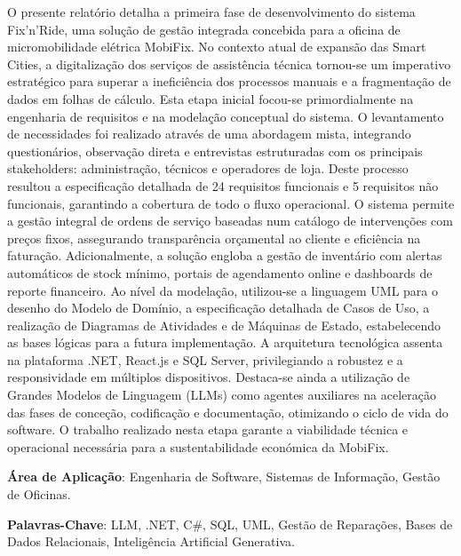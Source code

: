 \documentclass[a4paper,12pt]{scrreprt}
\begin{document}

\makecover


\renewenvironment{abstract}
 {\par\noindent\textbf{\Large\abstractname}\par\bigskip}
 {}

\begin{flushleft}
\begin{abstract}
   O presente relatório detalha a primeira fase de desenvolvimento do sistema Fix'n'Ride, uma solução de gestão integrada concebida para a oficina de micromobilidade elétrica MobiFix. No contexto atual de expansão das Smart Cities, a digitalização dos serviços de assistência técnica tornou-se um imperativo estratégico para superar a ineficiência dos processos manuais e a fragmentação de dados em folhas de cálculo. Esta etapa inicial focou-se primordialmente na engenharia de requisitos e na modelação conceptual do sistema. O levantamento de necessidades foi realizado através de uma abordagem mista, integrando questionários, observação direta e entrevistas estruturadas com os principais stakeholders: administração, técnicos e operadores de loja. Deste processo resultou a especificação detalhada de 24 requisitos funcionais e 5 requisitos não funcionais, garantindo a cobertura de todo o fluxo operacional. O sistema permite a gestão integral de ordens de serviço baseadas num catálogo de intervenções com preços fixos, assegurando transparência orçamental ao cliente e eficiência na faturação. Adicionalmente, a solução engloba a gestão de inventário com alertas automáticos de stock mínimo, portais de agendamento online e dashboards de reporte financeiro. Ao nível da modelação, utilizou-se a linguagem UML para o desenho do Modelo de Domínio, a especificação detalhada de Casos de Uso, a realização de Diagramas de Atividades e de Máquinas de Estado, estabelecendo as bases lógicas para a futura implementação. A arquitetura tecnológica assenta na plataforma .NET, React.js e SQL Server, privilegiando a robustez e a responsividade em múltiplos dispositivos. Destaca-se ainda a utilização de Grandes Modelos de Linguagem (LLMs) como agentes auxiliares na aceleração das fases de conceção, codificação e documentação, otimizando o ciclo de vida do software. O trabalho realizado nesta etapa garante a viabilidade técnica e operacional necessária para a sustentabilidade económica da MobiFix. \par \textbf{Área de Aplicação}: Engenharia de Software, Sistemas de Informação, Gestão de Oficinas. \par \textbf{Palavras-Chave}: LLM, .NET, C\#, SQL, UML, Gestão de Reparações, Bases de Dados Relacionais, Inteligência Artificial Generativa. \end{abstract}
\end{flushleft}
\end{document}
